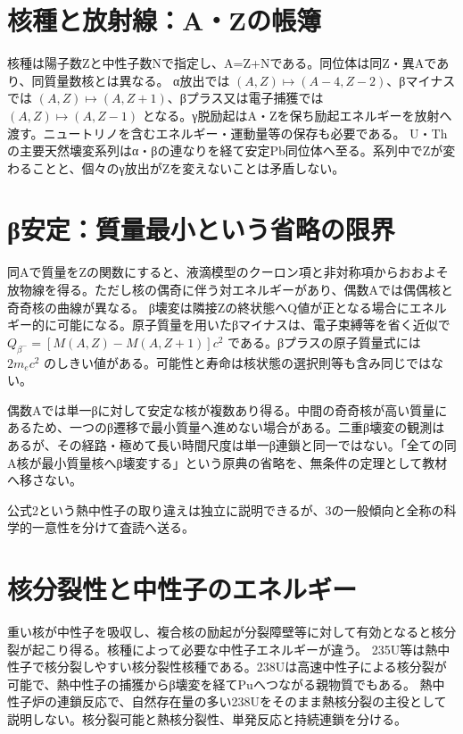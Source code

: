\section{核種と放射線：A・Zの帳簿}\label{theory:modern:nuclear}
核種は陽子数Zと中性子数Nで指定し、A=Z+Nである。同位体は同Z・異Aであり、同質量数核とは異なる。
α放出では \((A,Z)\mapsto(A-4,Z-2)\)、βマイナスでは \((A,Z)\mapsto(A,Z+1)\)、βプラス又は電子捕獲では \((A,Z)\mapsto(A,Z-1)\) となる。γ脱励起はA・Zを保ち励起エネルギーを放射へ渡す。ニュートリノを含むエネルギー・運動量等の保存も必要である。
U・Thの主要天然壊変系列はα・βの連なりを経て安定Pb同位体へ至る。系列中でZが変わることと、個々のγ放出がZを変えないことは矛盾しない\cite{modern_mit_nuclear,modern_series}。

\section{β安定：質量最小という省略の限界}\label{theory:modern:stability}
同Aで質量をZの関数にすると、液滴模型のクーロン項と非対称項からおおよそ放物線を得る。ただし核の偶奇に伴う対エネルギーがあり、偶数Aでは偶偶核と奇奇核の曲線が異なる。
β壊変は隣接Zの終状態へQ値が正となる場合にエネルギー的に可能になる。原子質量を用いたβマイナスは、電子束縛等を省く近似で \(Q_{\beta^-}=[M(A,Z)-M(A,Z+1)]c^2\) である。βプラスの原子質量式には \(2m_ec^2\) のしきい値がある。可能性と寿命は核状態の選択則等も含み同じではない。
\begin{tcolorbox}[title=平成23年度の最小質量への全称を保持しない]
偶数Aでは単一βに対して安定な核が複数あり得る。中間の奇奇核が高い質量にあるため、一つのβ遷移で最小質量へ進めない場合がある。二重β壊変の観測はあるが、その経路・極めて長い時間尺度は単一β連鎖と同一ではない。「全ての同A核が最小質量核へβ壊変する」という原典の省略を、無条件の定理として教材へ移さない。
\end{tcolorbox}
公式2という熱中性子の取り違えは独立に説明できるが、3の一般傾向と全称の科学的一意性を分けて査読へ送る\cite{modern_mit_mass,modern_doublebeta,modern_mit_nuclear}。

\section{核分裂性と中性子のエネルギー}\label{theory:modern:fission}
重い核が中性子を吸収し、複合核の励起が分裂障壁等に対して有効となると核分裂が起こり得る。核種によって必要な中性子エネルギーが違う。
235U等は熱中性子で核分裂しやすい核分裂性核種である。238Uは高速中性子による核分裂が可能で、熱中性子の捕獲からβ壊変を経てPuへつながる親物質でもある。
熱中性子炉の連鎖反応で、自然存在量の多い238Uをそのまま熱核分裂の主役として説明しない。核分裂可能と熱核分裂性、単発反応と持続連鎖を分ける\cite{modern_fastfission}。

